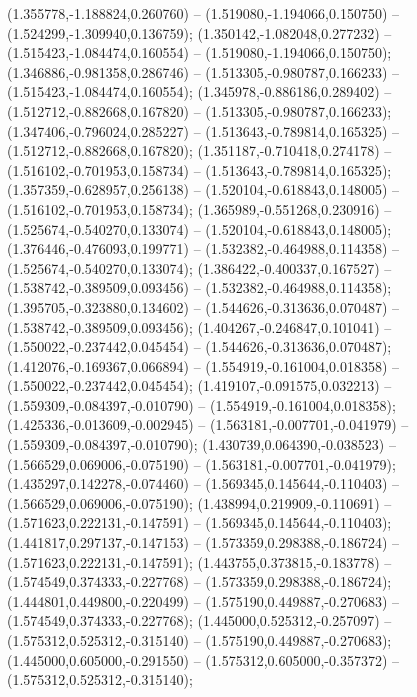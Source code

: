 (1.355778,-1.188824,0.260760) -- (1.519080,-1.194066,0.150750) -- (1.524299,-1.309940,0.136759);
 (1.350142,-1.082048,0.277232) -- (1.515423,-1.084474,0.160554) -- (1.519080,-1.194066,0.150750);
 (1.346886,-0.981358,0.286746) -- (1.513305,-0.980787,0.166233) -- (1.515423,-1.084474,0.160554);
 (1.345978,-0.886186,0.289402) -- (1.512712,-0.882668,0.167820) -- (1.513305,-0.980787,0.166233);
 (1.347406,-0.796024,0.285227) -- (1.513643,-0.789814,0.165325) -- (1.512712,-0.882668,0.167820);
 (1.351187,-0.710418,0.274178) -- (1.516102,-0.701953,0.158734) -- (1.513643,-0.789814,0.165325);
 (1.357359,-0.628957,0.256138) -- (1.520104,-0.618843,0.148005) -- (1.516102,-0.701953,0.158734);
 (1.365989,-0.551268,0.230916) -- (1.525674,-0.540270,0.133074) -- (1.520104,-0.618843,0.148005);
 (1.376446,-0.476093,0.199771) -- (1.532382,-0.464988,0.114358) -- (1.525674,-0.540270,0.133074);
 (1.386422,-0.400337,0.167527) -- (1.538742,-0.389509,0.093456) -- (1.532382,-0.464988,0.114358);
 (1.395705,-0.323880,0.134602) -- (1.544626,-0.313636,0.070487) -- (1.538742,-0.389509,0.093456);
 (1.404267,-0.246847,0.101041) -- (1.550022,-0.237442,0.045454) -- (1.544626,-0.313636,0.070487);
 (1.412076,-0.169367,0.066894) -- (1.554919,-0.161004,0.018358) -- (1.550022,-0.237442,0.045454);
 (1.419107,-0.091575,0.032213) -- (1.559309,-0.084397,-0.010790) -- (1.554919,-0.161004,0.018358);
 (1.425336,-0.013609,-0.002945) -- (1.563181,-0.007701,-0.041979) -- (1.559309,-0.084397,-0.010790);
 (1.430739,0.064390,-0.038523) -- (1.566529,0.069006,-0.075190) -- (1.563181,-0.007701,-0.041979);
 (1.435297,0.142278,-0.074460) -- (1.569345,0.145644,-0.110403) -- (1.566529,0.069006,-0.075190);
 (1.438994,0.219909,-0.110691) -- (1.571623,0.222131,-0.147591) -- (1.569345,0.145644,-0.110403);
 (1.441817,0.297137,-0.147153) -- (1.573359,0.298388,-0.186724) -- (1.571623,0.222131,-0.147591);
 (1.443755,0.373815,-0.183778) -- (1.574549,0.374333,-0.227768) -- (1.573359,0.298388,-0.186724);
 (1.444801,0.449800,-0.220499) -- (1.575190,0.449887,-0.270683) -- (1.574549,0.374333,-0.227768);
 (1.445000,0.525312,-0.257097) -- (1.575312,0.525312,-0.315140) -- (1.575190,0.449887,-0.270683);
 (1.445000,0.605000,-0.291550) -- (1.575312,0.605000,-0.357372) -- (1.575312,0.525312,-0.315140);
